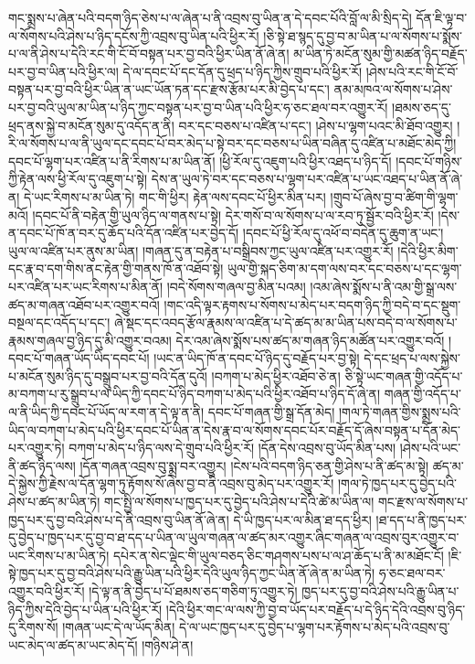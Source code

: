 གང་སྨྲས་པ་ཞེན་པའི་བདག་ཉིད་ཅེས་པ་ལ་ཞེན་པ་ནི་འབྲས་བུ་ཡིན་ན་དེ་དབང་པོའི་བློ་ལ་མི་སྲིད་དེ། དོན་ཇི་ལྟ་བ་ལ་སོགས་པའི་ཤེས་པ་ཉིད་དངོས་ཀྱི་འབྲས་བུ་ཡིན་པའི་ཕྱིར་རོ། །ཅི་སྟེ་ཐ་སྙད་དུ་བྱ་བ་མ་ཡིན་པ་ལ་སོགས་པ་སྨོས་པ་ལ་ནི་ཤེས་པ་དེའི་རང་གི་ངོ་བོ་བསྟན་པར་བྱ་བའི་ཕྱིར་ཡིན་ནོ་ཞེ་ན། མ་ཡིན་ཏེ་མངོན་སུམ་གྱི་མཚན་ཉིད་བརྗོད་པར་བྱ་བ་ཡིན་པའི་ཕྱིར་ལ། དེ་ལ་དབང་པོ་དང་དོན་དུ་ཕྲད་པ་ཉིད་ཀྱིས་གྲུབ་པའི་ཕྱིར་རོ། །ཤེས་པའི་རང་གི་ངོ་བོ་བསྟན་པར་བྱ་བའི་ཕྱིར་ཡིན་ན་ཡང་ཡོན་ཏན་དང་རྫས་རྩོམ་པར་མི་བྱེད་པ་དང་། ནམ་མཁའ་ལ་སོགས་པ་ཤེས་པར་བྱ་བའི་ཡུལ་མ་ཡིན་པ་ཉིད་ཀྱང་བསྟན་པར་བྱ་བ་ཡིན་པའི་ཕྱིར་ཧ་ཅང་ཐལ་བར་འགྱུར་རོ། །ཐམས་ཅད་དུ་ཕྲད་ནས་སྐྱེ་བ་མངོན་སུམ་དུ་འདོད་ན་ནི། བར་དང་བཅས་པ་འཛིན་པ་དང་། །ཤེས་པ་ལྷག་པའང་མི་ཐོབ་འགྱུར། །རི་ལ་སོགས་པ་ལ་ནི་ཡུལ་དང་དབང་པོ་བར་མེད་པ་སྟེ་བར་དང་བཅས་པ་ཡིན་བཞིན་དུ་འཛིན་པ་མཐོང་མེད་ཀྱི། དབང་པོ་ལྷག་པར་འཛིན་པ་ནི་རིགས་པ་མ་ཡིན་ནོ། །ཕྱི་རོལ་དུ་འཇུག་པའི་ཕྱིར་འཐད་པ་ཉིད་དོ། །དབང་པོ་གཉིས་ཀྱི་རྟེན་ལས་ཕྱི་རོལ་དུ་འཇུག་པ་སྟེ། དེས་ན་ཡུལ་ཏེ་བར་དང་བཅས་པ་ལྷག་པར་འཛིན་པ་ཡང་འཐད་པ་ཡིན་ནོ་ཞེ་ན། དེ་ཡང་རིགས་པ་མ་ཡིན་ཏེ། གང་གི་ཕྱིར། རྟེན་ལས་དབང་པོ་ཕྱིར་མིན་པར། །གྲུབ་པོ་ཞེས་བྱ་བ་ཚིག་གི་ལྷག་མའོ། །དབང་པོ་ནི་བརྟེན་གྱི་ཡུལ་ཉིད་ལ་གནས་པ་སྟེ། དེར་གསོ་བ་ལ་སོགས་པ་ལ་རབ་ཏུ་སྦྱོར་བའི་ཕྱིར་རོ། །དེས་ན་དབང་པོ་ཁོ་ན་བར་དུ་ཆོད་པའི་དོན་འཛིན་པར་བྱེད་དོ། །དབང་པོ་ཕྱི་རོལ་དུ་འཕོ་བ་བདེན་དུ་ཆུག་ན་ཡང་། ཡུལ་ལ་འཛིན་པར་ནུས་མ་ཡིན། །གཞན་དུ་ན་བརྟེན་པ་བསྒྲིབས་ཀྱང་ཡུལ་འཛིན་པར་འགྱུར་རོ། །དེའི་ཕྱིར་མིག་དང་རྣ་བ་དག་གིས་ནང་རྟེན་གྱི་གནས་ཁོ་ན་འཐོབ་སྟེ། ཡུལ་གྱི་སྐད་ཅིག་མ་དག་ལས་བར་དང་བཅས་པ་དང་ལྷག་པར་འཛིན་པར་ཡང་རིགས་པ་མིན་ནོ། །བདེ་སོགས་གཞལ་བྱ་མིན་པའམ། །འམ་ཞེས་སྨོས་པ་ནི་འམ་གྱི་སྒྲ་ལས་ཚད་མ་གཞན་འཐོབ་པར་འགྱུར་བའོ། །གང་འདི་ལྟར་རྟགས་པ་སོགས་པ་མེད་པར་བདག་ཉིད་ཀྱི་བདེ་བ་དང་སྡུག་བསྔལ་དང་འདོད་པ་དང་། ཞེ་སྡང་དང་འབད་རྩོལ་རྣམས་ལ་འཛིན་པ་དེ་ཚད་མ་མ་ཡིན་པས་བདེ་བ་ལ་སོགས་པ་རྣམས་གཞལ་བྱ་ཉིད་དུ་མི་འགྱུར་བའམ། དེར་འམ་ཞེས་སྨོས་པས་ཚད་མ་གཞན་ཉིད་མཚོན་པར་འགྱུར་བའོ། །དབང་པོ་གཞན་ཡོད་ཡིད་དབང་པོ། །ཡང་ན་ཡིད་ཁོ་ན་དབང་པོ་ཉིད་དུ་བརྗོད་པར་བྱ་སྟེ། དེ་དང་ཕྲད་པ་ལས་སྐྱེས་པ་མངོན་སུམ་ཉིད་དུ་བསྒྲུབ་པར་བྱ་བའི་དོན་དུའོ། །བཀག་པ་མེད་ཕྱིར་འཐོབ་ཅེ་ན། ཅི་སྟེ་ཡང་གཞན་གྱི་འདོད་པ་མ་བཀག་པ་རུ་སྒྲུབ་པ་ལ་ཡིད་ཀྱི་དབང་པོ་ཉིད་བཀག་པ་མེད་པའི་ཕྱིར་འཐོབ་པ་ཉིད་དོ་ཞེ་ན། གཞན་གྱི་འདོད་པ་ལ་ནི་ཡིད་ཀྱི་དབང་པོ་ཡོད་ལ་རག་ན་དེ་ལྟ་ན་ནི། དབང་པོ་གཞན་གྱི་སྒྲ་དོན་མེད། །གལ་ཏེ་གཞན་གྱིས་སྨྲས་པའི་ཡིད་ལ་བཀག་པ་མེད་པའི་ཕྱིར་དབང་པོ་ཡིན་ན་དེས་རྣ་བ་ལ་སོགས་དབང་པོར་བརྗོད་དོ་ཞེས་བསྟན་པ་དོན་མེད་པར་འགྱུར་ཏེ། བཀག་པ་མེད་པ་ཉིད་ལས་དེ་གྲུབ་པའི་ཕྱིར་རོ། །དོན་དེས་འབྲས་བུ་ཡོད་མིན་པས། །ཤེས་པའི་ཡང་ནི་ཚད་ཉིད་ལས། །དོན་གཞན་འབྲས་བུ་སྨྲ་བར་འགྱུར། །ངེས་པའི་བདག་ཉིད་ཅན་གྱི་ཤེས་པ་ནི་ཚད་མ་སྟེ། ཚད་མ་དེ་སྐྱེས་ཀྱི་རྗེས་ལ་དོན་ལྷག་ཏུ་རྟོགས་སོ་ཞེས་བྱ་བ་ནི་འབྲས་བུ་མེད་པར་འགྱུར་རོ། །གལ་ཏེ་ཁྱད་པར་དུ་བྱེད་པའི་ཤེས་པ་ཚད་མ་ཡིན་ཏེ། གང་སྤྱི་ལ་སོགས་པ་ཁྱད་པར་དུ་བྱེད་པའི་ཤེས་པ་དེའི་ཚེ་མ་ཡིན་ལ། གང་རྫས་ལ་སོགས་པ་ཁྱད་པར་དུ་བྱ་བའི་ཤེས་པ་དེ་ནི་འབྲས་བུ་ཡིན་ནོ་ཞེ་ན། དེ་ཡི་ཁྱད་པར་ལ་མིན་ཐ་དད་ཕྱིར། །ཐ་དད་པ་ནི་ཁྱད་པར་དུ་བྱེད་པ་ཁྱད་པར་དུ་བྱ་བ་ཐ་དད་པ་ཡིན་ལ་ཡུལ་གཞན་ལ་ཚད་མར་འགྱུར་ཞིང་གཞན་ལ་འབྲས་བུར་འགྱུར་བ་ཡང་རིགས་པ་མ་ཡིན་ཏེ། དཔེར་ན་སེང་ལྡེང་གི་ཡུལ་བཅད་ཅིང་གཤགས་པས་པ་ལ་ཤ་ཆོད་པ་ནི་མ་མཐོང་ངོ། །ཇི་སྟེ་ཁྱད་པར་དུ་བྱ་བའི་ཤེས་པའི་རྒྱུ་ཡིན་པའི་ཕྱིར་དེའི་ཡུལ་ཉིད་ཀྱང་ཡིན་ནོ་ཞེ་ན་མ་ཡིན་ཏེ། ཧ་ཅང་ཐལ་བར་འགྱུར་བའི་ཕྱིར་རོ། །དེ་ལྟ་ན་ནི་བྱེད་པ་པོ་ཐམས་ཅད་གཅིག་ཏུ་འགྱུར་ཏེ། ཁྱད་པར་དུ་བྱ་བའི་ཤེས་པའི་རྒྱུ་ཡིན་པ་ཉིད་ཀྱིས་དེའི་བྱེད་པ་ཡིན་པའི་ཕྱིར་རོ། །དེའི་ཕྱིར་གང་ལ་ལས་ཀྱི་བྱ་བ་ཡོད་པར་བརྗོད་པ་དེ་ཉིད་དེའི་འབྲས་བུ་ཉིད་དུ་རིགས་སོ། །གཞན་ཡང་དེ་ལ་ཡོད་མིན། དེ་ལ་ཡང་ཁྱད་པར་དུ་བྱེད་པ་ལྷག་པར་རྟོགས་པ་མེད་པའི་འབྲས་བུ་ཡང་མེད་ལ་ཚད་མ་ཡང་མེད་དོ། །གཉིས་ཤེ་ན། 